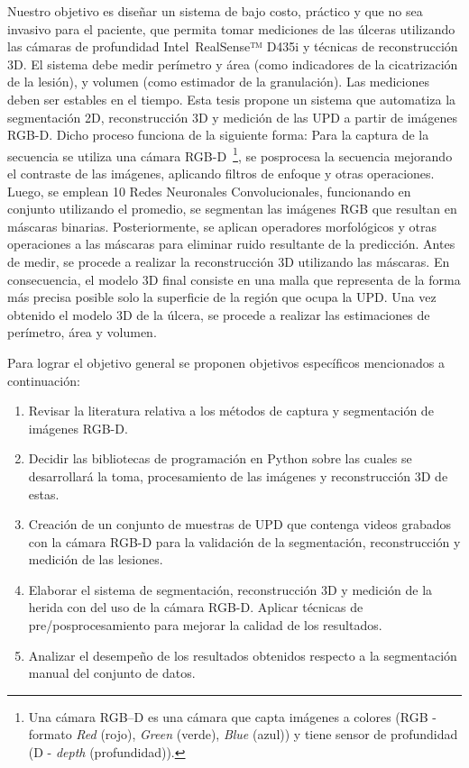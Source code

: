 Nuestro objetivo es diseñar un sistema de bajo costo, práctico y que no sea invasivo para el paciente, que permita tomar mediciones de las úlceras utilizando las cámaras de profundidad Intel~\textregistered RealSense™ D435i y técnicas de reconstrucción 3D. El sistema debe medir perímetro y área (como indicadores de la cicatrización de la lesión), y volumen (como estimador de la granulación). Las mediciones deben ser estables en el tiempo. Esta tesis propone un sistema que automatiza la segmentación 2D, reconstrucción 3D y medición de las UPD a partir de imágenes RGB-D. Dicho proceso funciona de la siguiente forma: Para la captura de la secuencia se utiliza una cámara RGB-D~\footnote{Una cámara RGB–D es una cámara que capta imágenes a colores (RGB - formato \textit{Red} (rojo), \textit{Green} (verde), \textit{Blue} (azul)) y tiene sensor de profundidad (D - \textit{depth} (profundidad)).}, se posprocesa la secuencia mejorando el contraste de las imágenes, aplicando filtros de enfoque y otras operaciones. Luego, se emplean 10 Redes Neuronales Convolucionales, funcionando en conjunto utilizando el promedio, se segmentan las imágenes RGB que resultan en máscaras binarias. Posteriormente, se aplican operadores morfológicos y otras operaciones a las máscaras para eliminar ruido resultante de la predicción. Antes de medir, se procede a realizar la reconstrucción 3D utilizando las máscaras. En consecuencia, el modelo 3D final consiste en una malla que representa de la forma más precisa posible solo la superficie de la región que ocupa la UPD. Una vez obtenido el modelo 3D de la úlcera, se procede a realizar las estimaciones de perímetro, área y volumen.

Para lograr el objetivo general se proponen objetivos específicos mencionados a continuación:

\begin{enumerate}
    \item Revisar la literatura relativa a los métodos de captura y segmentación de imágenes RGB-D.
    \item Decidir las bibliotecas de programación en Python sobre las cuales se desarrollará la toma, procesamiento de las imágenes y reconstrucción 3D de estas.
    \item Creación de un conjunto de muestras de UPD que contenga videos grabados con la cámara RGB-D para la validación de la segmentación, reconstrucción y medición de las lesiones.
    \item Elaborar el sistema de segmentación, reconstrucción 3D y medición de la herida con del uso de la cámara RGB-D. Aplicar técnicas de pre/posprocesamiento para mejorar la calidad de los resultados.
    \item Analizar el desempeño de los resultados obtenidos respecto a la segmentación manual del conjunto de datos.
\end{enumerate}

